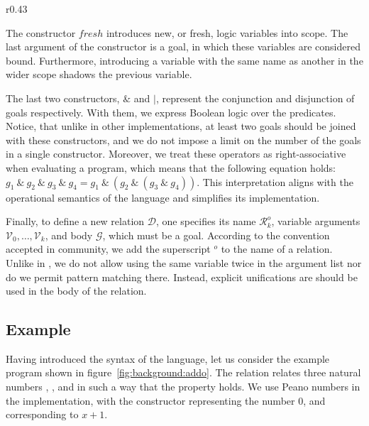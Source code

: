\documentclass[crop=false]{standalone}
\begin{document}
\begin{wrapfigure}{r}{0.43\textwidth}
  
\end{wrapfigure}

The constructor $fresh$ introduces new, or fresh, logic variables into scope. 
The last argument of the constructor is a goal, in which these variables are considered bound. 
Furthermore, introducing a variable with the same name as another in the wider scope shadows the previous variable. 

The last two constructors, $\&$ and $|$, represent the conjunction and disjunction of goals respectively.
With them, we express Boolean logic over the predicates. 
Notice, that unlike in other \mk implementations, at least two goals should be joined with these constructors, and we do not impose a limit on the number of the goals in a single constructor.
Moreover, we treat these operators as right-associative when evaluating a \mk program, which means that the following equation holds: $g_1 \ \& \ g_2 \ \& \ g_3 \ \& \ g_4 = g_1 \ \& \ (g_2 \ \& \ (g_3 \ \& \ g_4))$.
This interpretation aligns with the operational semantics of the language and simplifies its implementation.

Finally, to define a new relation $\mathcal{D}$, one specifies its name $\mathcal{R}^o_k$, variable arguments $\mathcal{V}_0, \dots, \mathcal{V}_k$, and body $\mathcal{G}$, which must be a goal. 
According to the convention accepted in \mk community, we add the superscript $^o$ to the name of a relation. 
Unlike in \prolog, we do not allow using the same variable twice in the argument list nor do we permit pattern matching there. 
Instead, explicit unifications are should be used in the body of the relation. 

\subsection{Example}

Having introduced the syntax of the language, let us consider the example program shown in figure~\ref{fig:background:addo}. 
The relation  relates three natural numbers , , and  in such a way that the property  holds. 
We use Peano numbers in the implementation, with the constructor  representing the number $0$, and  corresponding to $x+1$. 


\end{document}
